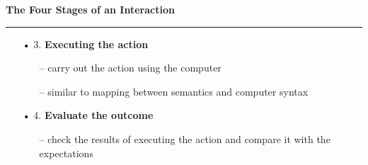 \documentclass[pdf]{beamer}
\begin{document}
\begin{frame} 
\vspace{8mm}
\textcolor{myBlue}{\textbf{\Large{The Four Stages of an Interaction}}}

\textcolor{red}{\rule{10cm}{1mm}}

\begin{itemize}
	\item[\textcolor{black}{•}] 3. \textbf{Executing the action}
    \smallskip
	\begin{itemize}
    	\item[\textcolor{black}{--}] carry out the action using the computer
        \smallskip
        \item[\textcolor{black}{--}] similar to mapping between semantics and computer syntax
         \smallskip
         \begin{itemize}  \end{itemize}
	\end{itemize}
	\medskip
    
	\item[\textcolor{black}{•}] 4. \textbf{Evaluate the outcome}
    \smallskip
	\begin{itemize}
		\item[\textcolor{black}{--}] check the results of executing the action and compare it with the expectations
        \smallskip
        \begin{itemize}
        \end{itemize}
	\end{itemize}  
\end{itemize}
\bigskip \bigskip
\end{frame}
\end{document}
